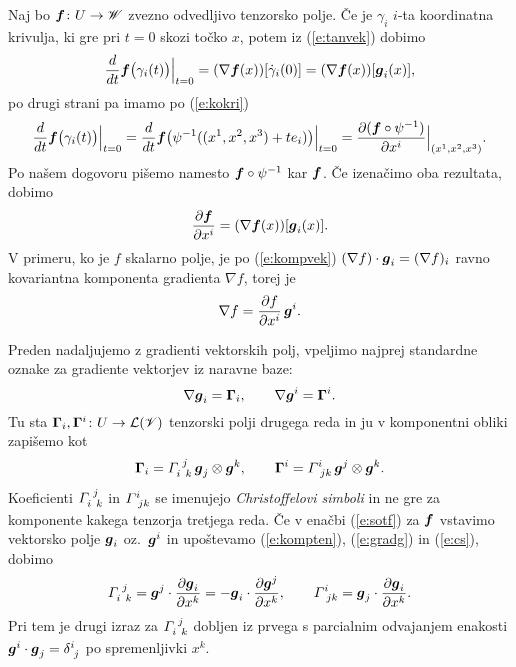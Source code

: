 Naj bo $\boldsymbol f\colon U\to\mathscr W$ zvezno odvedljivo tenzorsko polje. Če je $\gamma_i$ $i$-ta
koordinatna krivulja, ki gre pri $t=0$ skozi točko $x$, potem iz (\ref{e:tanvek}) dobimo
\begin{equation*}
	\frac{d}{dt}\boldsymbol f\big(\gamma_i(t)\big)\Big|_{t=0}=
	(\nabla \boldsymbol f(x))[\dot{\gamma}_i(0)]=(\nabla \boldsymbol f(x))[\boldsymbol g_i(x)],
\end{equation*}
po drugi strani pa imamo po (\ref{e:kokri})
\begin{equation*}
	\frac{d}{dt}\boldsymbol f\big(\gamma_i(t)\big)\Big|_{t=0}=
	\frac{d}{dt}\boldsymbol f\big(\psi^{-1}((x^1,x^2,x^3)+te_i)\big)\Big|_{t=0}=
	\frac{\partial(\boldsymbol f\circ\psi^{-1})}{\partial x^i}\Big|_{(x^1,x^2,x^3)}.
\end{equation*}
Po našem dogovoru pišemo namesto $\boldsymbol f\circ\psi^{-1}$ kar $\boldsymbol f$. Če izenačimo oba rezultata, dobimo
\begin{equation} \label{e:sotf}
	\frac{\partial\boldsymbol f}{\partial x^i}=(\nabla \boldsymbol f(x))[\boldsymbol g_i(x)].
\end{equation}
V primeru, ko je $f$ skalarno polje, je po (\ref{e:kompvek}) $(\nabla f)\cdot\boldsymbol g_i=(\nabla f)_i$
ravno kovariantna komponenta gradienta $\nabla f$, torej je
\begin{equation} \label{e:gradskal}
	\nabla f = \frac{\partial f}{\partial x^i}\,\boldsymbol g^i.
\end{equation}

Preden nadaljujemo z gradienti vektorskih polj, vpeljimo najprej standardne oznake
za gradiente vektorjev iz naravne baze:
\begin{equation} \label{e:gradg}
	\nabla\boldsymbol g_i=\mathbf \Gamma_i,\qquad\nabla\boldsymbol g^i=\mathbf \Gamma^i.
\end{equation}
Tu sta $\mathbf \Gamma_i,\mathbf \Gamma^i\colon U\to\mathcal L(\mathscr V)$ tenzorski polji drugega reda in ju
v komponentni obliki zapišemo kot
\begin{equation} \label{e:cs}
	\ten{\Gamma}_i=\cs{i}{j}{k}\,\vek{g}_j\otimes\vek{g}^k,\qquad\ten{\Gamma}^i=\ks{i}{jk}\,\vek{g}^j\otimes\vek{g}^k.
\end{equation}
Koeficienti $\cs{i}{j}{k}$ in $\ks{i}{jk}$ se imenujejo \emph{Christoffelovi simboli}
in ne gre za komponente kakega tenzorja tretjega reda. Če v enačbi (\ref{e:sotf})
za $\boldsymbol f$ vstavimo vektorsko polje $\boldsymbol g_i$ oz.~$\boldsymbol g^i$ in upoštevamo
(\ref{e:kompten}), (\ref{e:gradg}) in (\ref{e:cs}), dobimo
\begin{equation} \label{e:csexplicit}
	\cs{i}{j}{k}=\vek{g}^j\cdot\frac{\partial\vek{g}_i}{\partial x^k}
	=-\vek{g}_i\cdot\frac{\partial\vek{g}^j}{\partial x^k},\qquad
	\ks{i}{jk}=\vek{g}_j\cdot\frac{\partial\vek{g}_i}{\partial x^k}.
\end{equation}
Pri tem je drugi izraz za $\cs{i}{j}{k}$ dobljen iz prvega s parcialnim odvajanjem
enakosti $\vek{g}^i\cdot\vek{g}_j=\topbot{\delta}{i}{j}$ po spremenljivki $x^k$.

